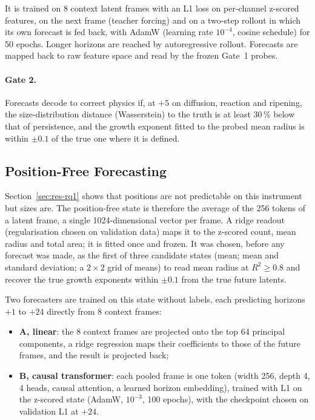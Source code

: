 It is trained on 8 context latent frames with an L1 loss on per-channel z-scored
features, on the next frame (teacher forcing) and on a two-step rollout in which its own
forecast is fed back, with AdamW (learning rate $10^{-4}$, cosine schedule) for 50
epochs. Longer horizons are reached by autoregressive rollout. Forecasts are mapped back
to raw feature space and read by the frozen Gate~1 probes.

\paragraph{Gate 2.} Forecasts decode to correct physics if, at $+5$ on diffusion,
reaction and ripening, the size-distribution distance (Wasserstein) to the truth is at
least 30\,\% below that of persistence, and the growth exponent fitted to the probed mean
radius is within $\pm 0.1$ of the true one where it is defined.

\subsection{Position-Free Forecasting}
\label{sec:pooled}

Section~\ref{sec:res-rq1} shows that positions are not predictable on this instrument but
sizes are. The position-free state is therefore the average of the 256 tokens of a latent
frame, a single 1024-dimensional vector per frame. A ridge readout (regularisation chosen
on validation data) maps it to the z-scored count, mean radius and total area; it is
fitted once and frozen. It was chosen, before any forecast was made, as the first of
three candidate states (mean; mean and standard deviation; a $2 \times 2$ grid of means)
to read mean radius at $R^2 \geq 0.8$ and recover the true growth exponents within
$\pm 0.1$ from the true future latents.

Two forecasters are trained on this state without labels, each predicting horizons
$+1$ to $+24$ directly from 8 context frames:
\begin{itemize}
  \item \textbf{A, linear}: the 8 context frames are projected onto the top 64 principal
    components, a ridge regression maps their coefficients to those of the future frames,
    and the result is projected back;
  \item \textbf{B, causal transformer}: each pooled frame is one token (width 256,
    depth 4, 4 heads, causal attention, a learned horizon embedding), trained with L1 on
    the z-scored state (AdamW, $10^{-3}$, 100 epochs), with the checkpoint chosen on
    validation L1 at $+24$.
\end{itemize}

